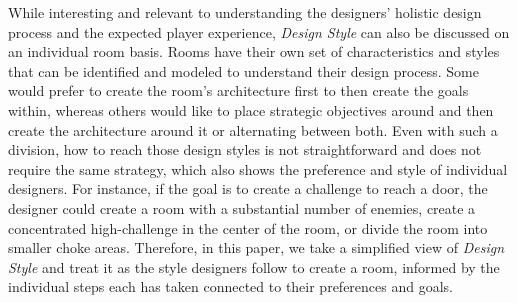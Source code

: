 While interesting and relevant to understanding the designers' holistic design process and the expected player experience, \emph{Design Style} can also be discussed on an individual room basis. Rooms have their own set of characteristics and styles that can be identified and modeled to understand their design process. Some would prefer to create the room's architecture first to then create the goals within, whereas others would like to place strategic objectives around and then create the architecture around it or alternating between both. Even with such a division, how to reach those design styles is not straightforward and does not require the same strategy, which also shows the preference and style of individual designers. For instance, if the goal is to create a challenge to reach a door, the designer could create a room with a substantial number of enemies, create a concentrated high-challenge in the center of the room, or divide the room into smaller choke areas. Therefore, in this paper, we take a simplified view of \emph{Design Style} and treat it as the style designers follow to create a room, informed by the individual steps each has taken connected to their preferences and goals.




